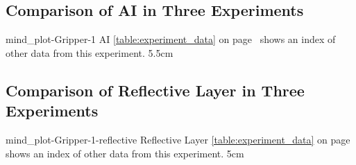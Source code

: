 {\clearpage
  \begin{samepage}
    \section{Comparison of AI in Three Experiments}
    \experimentcausegroupplots{\dataappendixmaxtime}
                              {\dataappendixexperimentonemaxtime}
                              {\dataappendixexperimenttwomaxtime}
                              {\dataappendixexperimentthreemaxtime}
                              {\dataappendixexperimentonename}
                              {\dataappendixexperimenttwoname}
                              {\dataappendixexperimentthreename}
                              {\dataappendixexperimentoneprettyname}
                              {\dataappendixexperimenttwoprettyname}
                              \experimentcausegroupplotscontinued{\dataappendixexperimentthreeprettyname}
                                                                 {mind_plot-Gripper-1}
                                                                 {AI}
                                                                 { {\mbox{\autoref{table:experiment_data}}} on
                                                                   {\mbox{page~\pageref{table:experiment_data}}} shows an index of other data
                                                                   from this experiment.}
                                                                 {5.5cm}
  \end{samepage}
}
{\clearpage
  \begin{samepage}
    \section{Comparison of Reflective Layer in Three Experiments}
    \experimentcausegroupplots{\dataappendixmaxtime}
                              {\dataappendixexperimentonemaxtime}
                              {\dataappendixexperimenttwomaxtime}
                              {\dataappendixexperimentthreemaxtime}
                              {\dataappendixexperimentonename}
                              {\dataappendixexperimenttwoname}
                              {\dataappendixexperimentthreename}
                              {\dataappendixexperimentoneprettyname}
                              {\dataappendixexperimenttwoprettyname}
                              \experimentcausegroupplotscontinued{\dataappendixexperimentthreeprettyname}
                                                                 {mind_plot-Gripper-1-reflective}
                                                                 {Reflective Layer}
                                                                 {  {\mbox{\autoref{table:experiment_data}}} on
                                                                   {\mbox{page~\pageref{table:experiment_data}}} shows an index of other data
                                                                   from this experiment.}
                                                                 {5cm}
  \end{samepage}
}
